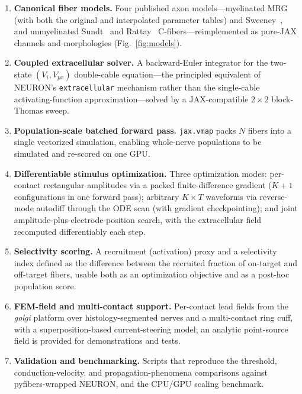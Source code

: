 \documentclass[preprint,12pt,a4paper]{elsarticle}
\begin{document}
\begin{enumerate}
  \item \textbf{Canonical fiber models.} Four published axon models---myelinated
        MRG~\cite{mcintyre} (with both the original and interpolated parameter tables) and
        Sweeney~\cite{sweeney}, and unmyelinated Sundt~\cite{sundt} and Rattay~\cite{rattay}
        C-fibers---reimplemented as pure-JAX channels and morphologies
        (Fig.~\ref{fig:models}).
  \item \textbf{Coupled extracellular solver.} A backward-Euler integrator for the two-state
        $(V_i, V_{px})$ double-cable equation---the principled equivalent of NEURON's
        \texttt{extracellular} mechanism rather than the single-cable activating-function
        approximation---solved by a JAX-compatible $2\times2$ block-Thomas sweep.
  \item \textbf{Population-scale batched forward pass.} \texttt{jax.vmap} packs $N$ fibers into
        a single vectorized simulation, enabling whole-nerve populations to be simulated and
        re-scored on one GPU.
  \item \textbf{Differentiable stimulus optimization.} Three optimization modes: per-contact
        rectangular amplitudes via a packed finite-difference gradient ($K{+}1$ configurations
        in one forward pass); arbitrary $K\times T$ waveforms via reverse-mode autodiff through
        the ODE scan (with gradient checkpointing); and joint amplitude-plus-electrode-position
        search, with the extracellular field recomputed differentiably each step.
  \item \textbf{Selectivity scoring.} A recruitment (activation) proxy and a selectivity index
        defined as the difference between the recruited fraction of on-target and off-target
        fibers, usable both as an optimization objective and as a post-hoc population score.
  \item \textbf{FEM-field and multi-contact support.} Per-contact lead fields from the
        \emph{golgi} platform over histology-segmented nerves and a multi-contact ring cuff,
        with a superposition-based current-steering model; an analytic point-source field is
        provided for demonstrations and tests.
  \item \textbf{Validation and benchmarking.} Scripts that reproduce the threshold,
        conduction-velocity, and propagation-phenomena comparisons against pyfibers-wrapped
        NEURON, and the CPU/GPU scaling benchmark.
\end{enumerate}
\end{document}
